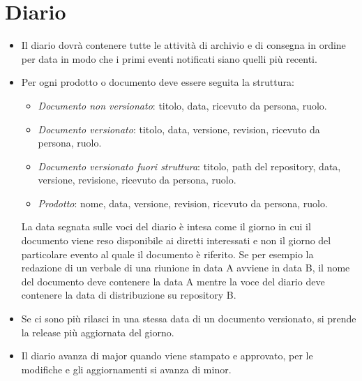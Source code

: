 \section{Diario}

\begin{itemize}
	
	\item Il diario dovr\`a contenere tutte le attivit\`a di archivio e di consegna in ordine per data in modo che i primi eventi notificati siano quelli pi\`u recenti.
	
	\item Per ogni prodotto o documento deve essere seguita la struttura:
	\begin{itemize}
		\item \emph{Documento non versionato}: titolo, data, ricevuto da persona, ruolo. 
		\item \emph{Documento versionato}: titolo, data, versione, revision, ricevuto da persona, ruolo. 
		\item \emph{Documento versionato fuori struttura}: titolo, path del repository, data, versione, revisione, ricevuto da persona, ruolo.
		\item \emph{Prodotto}: nome, data, versione, revision, ricevuto da persona, ruolo.
	\end{itemize}
	La data segnata sulle voci del diario \`e intesa come il giorno in cui il documento viene reso disponibile ai diretti interessati e non il giorno del particolare evento al quale il documento \`e riferito. Se per esempio la redazione di un verbale di una riunione in data A avviene in data B, il nome del documento deve contenere la data A mentre la voce del diario deve contenere la data di distribuzione su repository B.
	\item Se ci sono pi\`u rilasci in una stessa data di un documento versionato, si prende la release pi\`u aggiornata del giorno.
	
	\item Il diario avanza di major quando viene stampato e approvato, per le modifiche e gli aggiornamenti si avanza di minor. 
	
\end{itemize}

